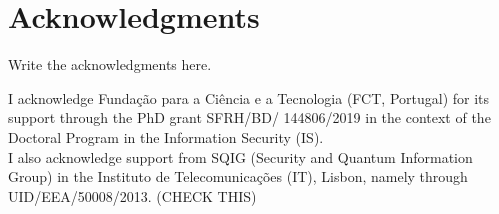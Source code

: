 

\chapter*{Acknowledgments}
Write the acknowledgments here.

\vfill
\begin{center}\begin{footnotesize}
I acknowledge Funda\c{c}\~{a}o para a Ci\^{e}ncia e a Tecnologia (FCT, Portugal) for its support through the PhD grant SFRH/BD/ 144806/2019 in the context of the Doctoral Program in the Information Security (IS).\\
I also acknowledge support from SQIG (Security and Quantum Information Group) in the Instituto de Telecomunica\c{c}\~{o}es (IT), Lisbon, namely through UID/EEA/50008/2013. (CHECK THIS)
\end{footnotesize}
\end{center}

